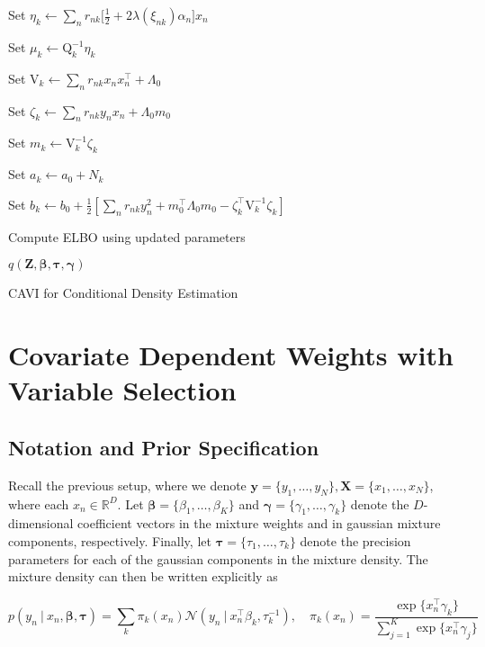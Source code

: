 \documentclass[twoside,11pt]{article}
\newcommand\given[1][]{\:#1\vert\:}
\newcommand{\transpose}[1]{#1^{\intercal}}
\newcommand{\R}{\mathbb{R}}
\newcommand{\nsum}{\sum\limits_{n}}
\newcommand{\ksum}{\sum\limits_{k}}
\newcommand{\boldbeta}{\boldsymbol\beta}
\newcommand{\boldgamma}{\boldsymbol\gamma}
\newcommand{\boldtau}{\boldsymbol\tau}
\newcommand{\pr}[1]{p \left( #1 \right)}
\begin{document}
\begin{algorithm}[H]
{{   Set $\eta_k \leftarrow \sum_{n} r_{nk} \big[ \frac{1}{2} + 2\lambda(\xi_{nk}) \alpha_n \big]x_n$\; %
         
   Set $\mu_k \leftarrow \mathrm{Q}_k^{-1} \eta_k$\; %
   
   Set $\mathrm{V}_k \leftarrow \nsum r_{nk} x_n \transpose{x_n} + \Lambda_0$ \; %
   
   Set $\zeta_k \leftarrow \sum_{n} r_{nk} y_n x_n + \Lambda_0 m_0$\; %
   
   Set $m_k \leftarrow \mathrm{V}_k^{-1} \zeta_k$\; %
   
   Set $a_k \leftarrow a_0 + N_k$\; %
   
   Set $b_k \leftarrow b_0 + \frac{1}{2}[\nsum r_{nk} y_n^2 + \transpose{m_0}\Lambda_0 m_0 - \transpose{\zeta_k} \mathrm{V}_k^{-1} \zeta_k]$\; %
   }
   Compute ELBO using updated parameters
 } %
 \Return $q \left( \mathbf{Z}, \boldbeta, \boldtau, \boldgamma \right)$
 \caption{CAVI for Conditional Density Estimation}
\end{algorithm}


\section{Covariate Dependent Weights with Variable Selection} \label{vs}  %


\subsection{Notation and Prior Specification}
Recall the previous setup, where we denote $\mathbf{y} = \{y_1, \ldots, y_N \}, \mathbf{X} = \{ x_1, \ldots, x_N \}$, where each $x_n \in \R^{D}$. Let $\boldbeta = \{ \beta_1, \ldots, \beta_K\}$ and $\boldgamma = \{ \gamma_1, \ldots, \gamma_k\}$ denote the $D$-dimensional coefficient vectors  in the mixture weights and in gaussian mixture components, respectively. Finally, let $\boldtau = \{ \tau_1, \ldots, \tau_k \}$ denote the precision parameters for each of the gaussian components in the mixture density. The mixture density can then be written explicitly as

\begin{equation} 
	 \pr{y_n \given x_n, \boldbeta, \boldtau} = \ksum \pi_k(x_n) \mathcal{N} \left( y_n \given \transpose{x_n}\beta_k, \tau_k^{-1} \right), \quad \pi_k(x_n) = \frac{\exp\{\transpose{x_n} \gamma_k\}}{\sum\limits_{j=1}^{K} \exp\{ \transpose{x_n} \gamma_j\}}
\end{equation}
\end{document}

